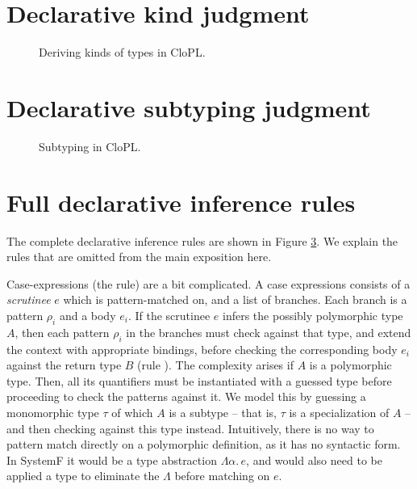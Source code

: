 \documentclass[sigplan,9pt,review]{acmart}\settopmatter{printfolios=true,printccs=false,printacmref=false}
\newcommand{\clopl}{\textsf{CloPL}\xspace}
\begin{document}
\begin{appendices}

\section{Declarative kind judgment}\label{app:decl-kind}
\begin{figure}[H]

\caption{Deriving kinds of types in \clopl.}
\label{fig:inference:kinds}
\end{figure}

\section{Declarative subtyping judgment}\label{app:decl-subtyping}
\begin{figure}[H]

\caption{Subtyping in \clopl.}
\label{fig:inference:subtyping}
\end{figure}

\section{Full declarative inference rules}\label{app:decl-rules}

\begin{figure*}

\caption{Full declarative inference rules for \clopl.}
\label{fig:inference:decl-rules}
\end{figure*}

The complete declarative inference rules are shown in Figure \ref{app:decl-rules}. We
explain the rules that are omitted from the main exposition here.

Case-expressions (the  rule) are a bit complicated. A case expressions consists
of a \textit{scrutinee} $e$ which is pattern-matched on, and a list of branches. Each branch is
a pattern $ρ_i$ and a body $e_i$. If the scrutinee $e$ infers the possibly polymorphic type
$A$, then each pattern $ρ_i$ in the branches must check against that type, and extend the
context with appropriate bindings, before checking the corresponding body $e_i$ against the
return type $B$ (rule ). The complexity arises if $A$ is a polymorphic type.
Then, all its quantifiers must be instantiated with a guessed type before proceeding to check
the patterns against it. We model this by guessing a monomorphic type $τ$ of which $A$ is
a subtype -- that is, $τ$ is a specialization of $A$ -- and then checking against this
type instead.
Intuitively, there is no way to pattern match directly on a polymorphic definition, as it
has no syntactic form. In \textsf{SystemF} it would be a type abstraction $Λα.\, e$, and would
also need to be applied a type to eliminate the $Λ$ before matching on $e$.


\end{appendices}
\end{document}
